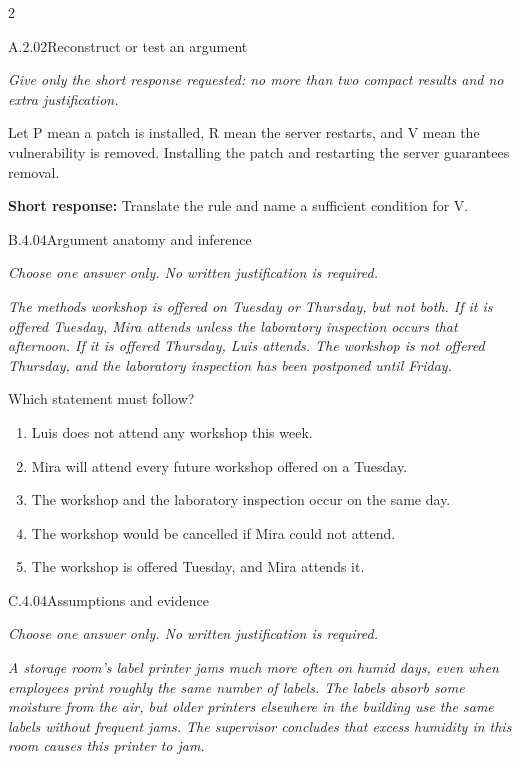 \documentclass[9pt]{extarticle}
\newcommand{\choice}[1]{\item #1}
\begin{document}
\begin{multicols}{2}
\begin{DenseCoreProblem}{A.2.02}{Reconstruct or test an argument}
{\scriptsize\textit{Give only the short response requested: no more than two compact results and no extra justification.}\par}
Let P mean a patch is installed, R mean the server restarts, and V mean the vulnerability is removed. Installing the patch and restarting the server guarantees removal.

\textbf{Short response:} Translate the rule and name a sufficient condition for V.
\end{DenseCoreProblem}
\begin{DenseCoreProblem}{B.4.04}{Argument anatomy and inference}
{\scriptsize\textit{Choose one answer only. No written justification is required.}\par}
\emph{The methods workshop is offered on Tuesday or Thursday, but not both. If it is offered Tuesday, Mira attends unless the laboratory inspection occurs that afternoon. If it is offered Thursday, Luis attends. The workshop is not offered Thursday, and the laboratory inspection has been postponed until Friday.}

Which statement must follow?
\begin{enumerate}[label=(\alph*)]
  \choice{Luis does not attend any workshop this week.}
  \choice{Mira will attend every future workshop offered on a Tuesday.}
  \choice{The workshop and the laboratory inspection occur on the same day.}
  \choice{The workshop would be cancelled if Mira could not attend.}
  \choice{The workshop is offered Tuesday, and Mira attends it.}
\end{enumerate}
\end{DenseCoreProblem}
\columnbreak
\begin{DenseCoreProblem}{C.4.04}{Assumptions and evidence}
{\scriptsize\textit{Choose one answer only. No written justification is required.}\par}
\emph{A storage room's label printer jams much more often on humid days, even when employees print roughly the same number of labels. The labels absorb some moisture from the air, but older printers elsewhere in the building use the same labels without frequent jams. The supervisor concludes that excess humidity in this room causes this printer to jam.}


\end{DenseCoreProblem}
\end{multicols}
\end{document}
